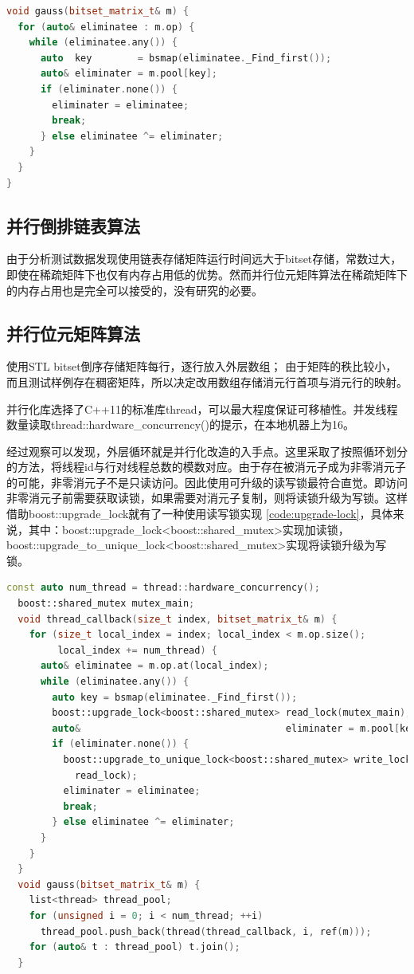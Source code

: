 \documentclass[a4paper]{article}
\begin{document}
\begin{lstlisting}[frame=trbl, language={C++}, caption={串行位元矩阵消元部分}]
void gauss(bitset_matrix_t& m) {
  for (auto& eliminatee : m.op) {
    while (eliminatee.any()) {
      auto  key        = bsmap(eliminatee._Find_first());
      auto& eliminater = m.pool[key];
      if (eliminater.none()) {
        eliminater = eliminatee;
        break;
      } else eliminatee ^= eliminater;
    }
  }
}
\end{lstlisting}

\subsection{并行倒排链表算法}
由于分析测试数据发现使用链表存储矩阵运行时间远大于bitset存储，常数过大，即使在稀疏矩阵下也仅有内存占用低的优势。然而并行位元矩阵算法在稀疏矩阵下的内存占用也是完全可以接受的，没有研究的必要。

\subsection{并行位元矩阵算法}
使用STL bitset倒序存储矩阵每行，逐行放入外层数组；
由于矩阵的秩比较小，而且测试样例存在稠密矩阵，所以决定改用数组存储消元行首项与消元行的映射。

并行化库选择了C++11的标准库thread，可以最大程度保证可移植性。并发线程数量读取thread::hardware\_concurrency()的提示，在本地机器上为16。

经过观察可以发现，外层循环就是并行化改造的入手点。这里采取了按照循环划分的方法，将线程id与行对线程总数的模数对应。由于存在被消元子成为非零消元子的可能，非零消元子不是只读访问。因此使用可升级的读写锁最符合直觉。即访问非零消元子前需要获取读锁，如果需要对消元子复制，则将读锁升级为写锁。这样借助boost::upgrade\_lock就有了一种使用读写锁实现 \ref{code:upgrade-lock}，具体来说，其中：boost::upgrade\_lock<boost::shared\_mutex>实现加读锁，boost::upgrade\_to\_unique\_lock<boost::shared\_mutex>实现将读锁升级为写锁。

\begin{lstlisting}[frame=trbl, language={C++}, caption={upgrade\_lock 位元矩阵消元部分}, label={code:upgrade-lock}]
  const auto num_thread = thread::hardware_concurrency();
  boost::shared_mutex mutex_main;
  void thread_callback(size_t index, bitset_matrix_t& m) {
    for (size_t local_index = index; local_index < m.op.size();
         local_index += num_thread) {
      auto& eliminatee = m.op.at(local_index);
      while (eliminatee.any()) {
        auto key = bsmap(eliminatee._Find_first());
        boost::upgrade_lock<boost::shared_mutex> read_lock(mutex_main);
        auto&                                    eliminater = m.pool[key];
        if (eliminater.none()) {
          boost::upgrade_to_unique_lock<boost::shared_mutex> write_lock(
            read_lock);
          eliminater = eliminatee;
          break;
        } else eliminatee ^= eliminater;
      }
    }
  }
  void gauss(bitset_matrix_t& m) {
    list<thread> thread_pool;
    for (unsigned i = 0; i < num_thread; ++i)
      thread_pool.push_back(thread(thread_callback, i, ref(m)));
    for (auto& t : thread_pool) t.join();
  }
\end{lstlisting}
\end{document}

